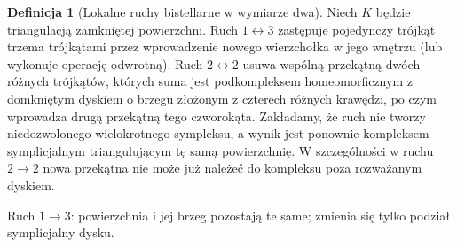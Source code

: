 \documentclass[11pt,a4paper]{report}
\numberwithin{equation}{section}
\theoremstyle{plain}
\theoremstyle{definition}
\newtheorem{definicja}[twierdzenie]{Definicja}
\theoremstyle{remark}
\begin{document}
\begin{definicja}[Lokalne ruchy bistellarne w wymiarze dwa]
Niech $K$ będzie triangulacją zamkniętej powierzchni.
Ruch $1\leftrightarrow3$ zastępuje pojedynczy trójkąt
trzema trójkątami przez wprowadzenie nowego wierzchołka
w jego wnętrzu (lub wykonuje operację odwrotną).
Ruch $2\leftrightarrow2$ usuwa wspólną przekątną dwóch
różnych trójkątów, których suma jest podkompleksem
homeomorficznym z domkniętym dyskiem o brzegu złożonym
z czterech różnych krawędzi, po czym wprowadza drugą
przekątną tego czworokąta. Zakładamy, że ruch nie tworzy
niedozwolonego wielokrotnego sympleksu, a wynik jest
ponownie kompleksem symplicjalnym triangulującym tę samą
powierzchnię. W szczególności w ruchu $2\to2$ nowa
przekątna nie może już należeć do kompleksu poza
rozważanym dyskiem.
\end{definicja}

\begin{samepage}
\begin{center}
\begin{minipage}{.96\linewidth}\centering
{}\par\smallskip

{\footnotesize Ruch $1\to3$: powierzchnia i jej brzeg pozostają te same;
zmienia się tylko podział symplicjalny dysku.}
\end{minipage}
\end{center}
\end{samepage}
\end{document}
